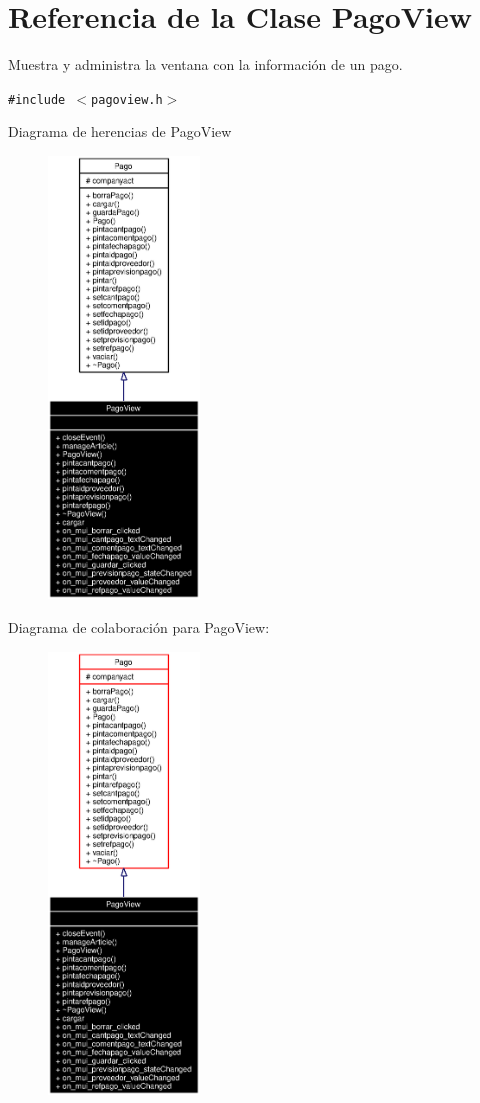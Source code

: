 \section{Referencia de la Clase Pago\-View}
\label{classPagoView}
Muestra y administra la ventana con la informaci\'{o}n de un pago.  


{\tt \#include $<$pagoview.h$>$}

Diagrama de herencias de Pago\-View\begin{figure}[H]
\begin{center}
\leavevmode
\includegraphics[width=114pt]{classPagoView__inherit__graph}
\end{center}
\end{figure}
Diagrama de colaboraci\'{o}n para Pago\-View:\begin{figure}[H]
\begin{center}
\leavevmode
\includegraphics[width=114pt]{classPagoView__coll__graph}
\end{center}
\end{figure}
